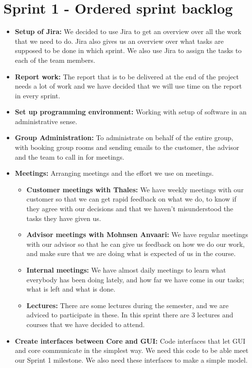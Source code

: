 \section{Sprint 1 - Ordered sprint backlog}

\begin{itemize}
\item{}\textbf{Setup of Jira:} We decided to use Jira to get an overview over all the work that we need to do. Jira also gives us an overview over what tasks are supposed to be done in which sprint. We also use Jira to assign the tasks to each of the team members.
\item{}\textbf{Report work:} The report that is to be delivered at the end of the project needs a lot of work and we have decided that we will use time on the report in every sprint.
\item{}\textbf{Set up programming environment:} Working with setup of software in an administrative sense.
\item{}\textbf{Group Administration:} To administrate on behalf of the entire group, with booking group rooms and sending emails to the customer, the advisor and the team to call in for meetings.
\item{}\textbf{Meetings:} Arranging meetings and the effort we use on meetings.
\begin{itemize}
\item{}\textbf{Customer meetings with Thales:} We have weekly meetings with our customer so that we can get rapid feedback on what we do, to know if they agree with our decisions and that we haven’t misunderstood the tasks they have given us.
\item{}\textbf{Advisor meetings with Mohnsen Anvaari:} We have regular meetings with our advisor so that he can give us feedback on how we do our work, and make sure that we are doing what is expected of us in the course.
\item{}\textbf{Internal meetings:} We have almost daily meetings to learn what everybody has been doing lately, and how far we have come in our tasks; what is left and what is done.
\item{}\textbf{Lectures:} There are some lectures during the semester, and we are adviced to participate in these. In this sprint there are 3 lectures and courses that we have decided to attend.
\end{itemize}
\item{}\textbf{Create interfaces between Core and GUI:} Code interfaces that let GUI and core communicate in the simplest way. We need this code to be able meet our Sprint 1 milestone. We also need these interfaces to make a simple model.

\end{itemize}
